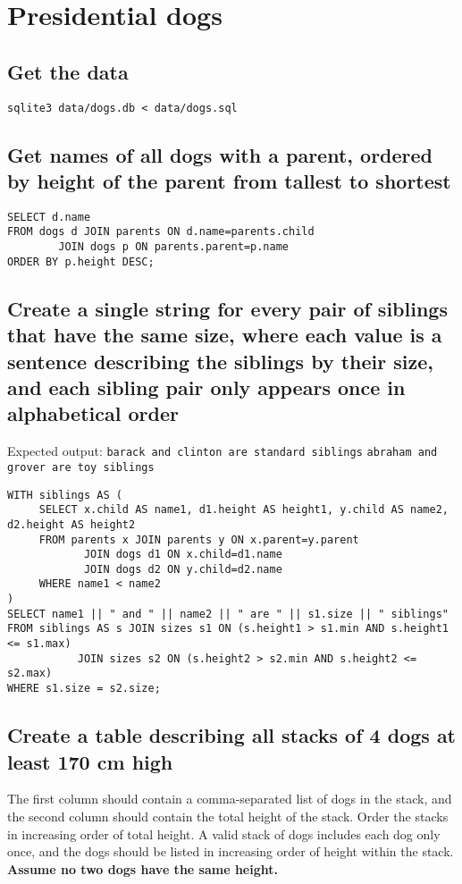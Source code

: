 \documentclass[11pt]{article}
\begin{document}
\section{Presidential dogs}
\label{sec-3}
\subsection{Get the data}
\label{sec-3-1}
\begin{verbatim}
sqlite3 data/dogs.db < data/dogs.sql
\end{verbatim}

\subsection{Get names of all dogs with a parent, ordered by height of the parent from tallest to shortest}
\label{sec-3-2}
\begin{verbatim}
SELECT d.name
FROM dogs d JOIN parents ON d.name=parents.child
	    JOIN dogs p ON parents.parent=p.name
ORDER BY p.height DESC;
\end{verbatim}

\subsection{Create a single string for every pair of siblings that have the same size, where each value is a sentence describing the siblings by their size, and each sibling pair only appears once in alphabetical order}
\label{sec-3-3}
Expected output:
\texttt{barack and clinton are standard siblings}
\texttt{abraham and grover are toy siblings}
\begin{verbatim}
WITH siblings AS (
     SELECT x.child AS name1, d1.height AS height1, y.child AS name2, d2.height AS height2
     FROM parents x JOIN parents y ON x.parent=y.parent
		    JOIN dogs d1 ON x.child=d1.name
		    JOIN dogs d2 ON y.child=d2.name
     WHERE name1 < name2
)
SELECT name1 || " and " || name2 || " are " || s1.size || " siblings"
FROM siblings AS s JOIN sizes s1 ON (s.height1 > s1.min AND s.height1 <= s1.max)
		   JOIN sizes s2 ON (s.height2 > s2.min AND s.height2 <= s2.max)
WHERE s1.size = s2.size;
\end{verbatim}

\subsection{Create a table describing all stacks of 4 dogs at least 170 cm high}
\label{sec-3-4}
The first column should contain a comma-separated list of dogs in the stack, and the second column should contain the total height of the stack. Order the stacks in increasing order of total height. A valid stack of dogs includes each dog only once, and the dogs should be listed in increasing order of height within the stack. \textbf{Assume no two dogs have the same height.}
\end{document}

